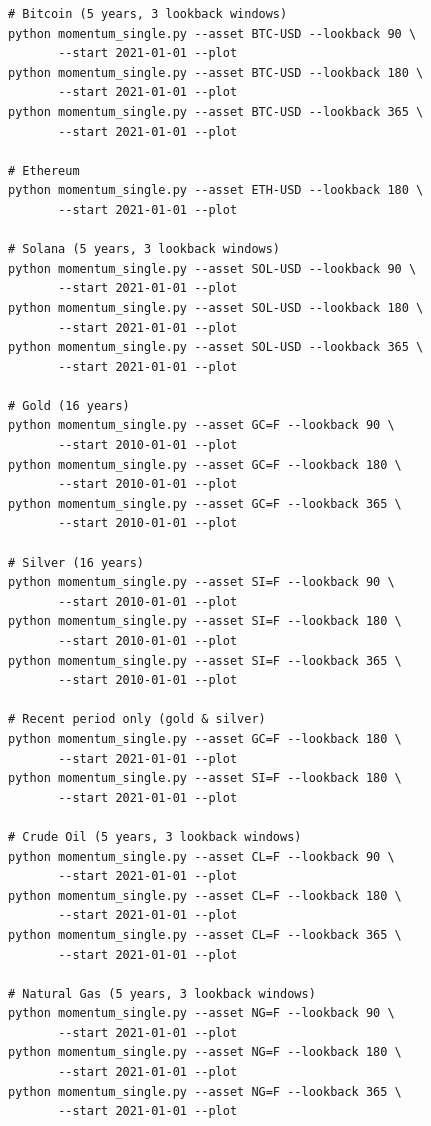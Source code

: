 \documentclass[11pt,a4paper]{article}
\begin{document}
\begin{codebox}
\begin{lstlisting}[style=shell]
# Bitcoin (5 years, 3 lookback windows)
python momentum_single.py --asset BTC-USD --lookback 90 \
       --start 2021-01-01 --plot
python momentum_single.py --asset BTC-USD --lookback 180 \
       --start 2021-01-01 --plot
python momentum_single.py --asset BTC-USD --lookback 365 \
       --start 2021-01-01 --plot

# Ethereum
python momentum_single.py --asset ETH-USD --lookback 180 \
       --start 2021-01-01 --plot

# Solana (5 years, 3 lookback windows)
python momentum_single.py --asset SOL-USD --lookback 90 \
       --start 2021-01-01 --plot
python momentum_single.py --asset SOL-USD --lookback 180 \
       --start 2021-01-01 --plot
python momentum_single.py --asset SOL-USD --lookback 365 \
       --start 2021-01-01 --plot

# Gold (16 years)
python momentum_single.py --asset GC=F --lookback 90 \
       --start 2010-01-01 --plot
python momentum_single.py --asset GC=F --lookback 180 \
       --start 2010-01-01 --plot
python momentum_single.py --asset GC=F --lookback 365 \
       --start 2010-01-01 --plot

# Silver (16 years)
python momentum_single.py --asset SI=F --lookback 90 \
       --start 2010-01-01 --plot
python momentum_single.py --asset SI=F --lookback 180 \
       --start 2010-01-01 --plot
python momentum_single.py --asset SI=F --lookback 365 \
       --start 2010-01-01 --plot

# Recent period only (gold & silver)
python momentum_single.py --asset GC=F --lookback 180 \
       --start 2021-01-01 --plot
python momentum_single.py --asset SI=F --lookback 180 \
       --start 2021-01-01 --plot

# Crude Oil (5 years, 3 lookback windows)
python momentum_single.py --asset CL=F --lookback 90 \
       --start 2021-01-01 --plot
python momentum_single.py --asset CL=F --lookback 180 \
       --start 2021-01-01 --plot
python momentum_single.py --asset CL=F --lookback 365 \
       --start 2021-01-01 --plot

# Natural Gas (5 years, 3 lookback windows)
python momentum_single.py --asset NG=F --lookback 90 \
       --start 2021-01-01 --plot
python momentum_single.py --asset NG=F --lookback 180 \
       --start 2021-01-01 --plot
python momentum_single.py --asset NG=F --lookback 365 \
       --start 2021-01-01 --plot


\end{lstlisting}
\end{codebox}
\end{document}
